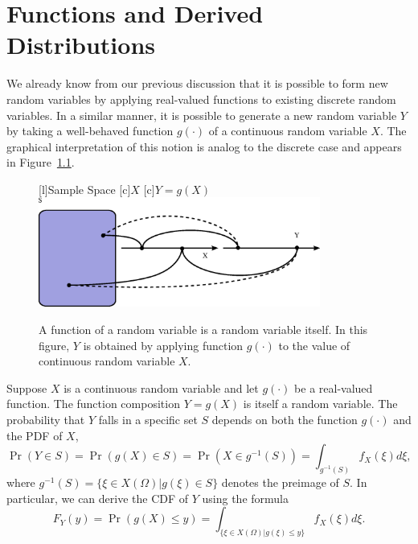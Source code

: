 \chapter{Functions and Derived Distributions}
\label{chapter:DerivedDistributions}

We already know from our previous discussion that it is possible to form new random variables by applying real-valued functions to existing discrete random variables.
In a similar manner, it is possible to generate a new random variable $Y$ by taking a well-behaved function $g(\cdot)$ of a continuous random variable $X$.
The graphical interpretation of this notion is analog to the discrete case and appears in Figure~\ref{figure:FunctionContinuousRV}.

\begin{figure}[ht]
\begin{center}
\begin{psfrags}
[l]{Sample Space}
[c]{$X$}
[c]{$Y = g(X)$}
\includegraphics[width=9.26cm]{Figures/9Chapter/fcn-cnt}
\end{psfrags}
\caption{A function of a random variable is a random variable itself.
In this figure, $Y$ is obtained by applying function $g(\cdot)$ to the value of continuous random variable $X$.}
\label{figure:FunctionContinuousRV}
\end{center}
\end{figure}

Suppose $X$ is a continuous random variable and let $g(\cdot)$ be a real-valued function.
The function composition $Y = g(X)$ is itself a random variable.
The probability that $Y$ falls in a specific set $S$ depends on both the function $g(\cdot)$ and the PDF of $X$,
\begin{equation*}
\Pr (Y \in S) = \Pr (g(X) \in S) 
= \Pr \left( X \in g^{-1}(S) \right)
= \int_{g^{-1} (S)} f_X (\xi) d\xi ,
\end{equation*}
where $g^{-1} (S) = \{ \xi \in X(\Omega) | g(\xi) \in S \}$ denotes the preimage of $S$.
In particular, we can derive the CDF of $Y$ using the formula
\begin{equation} \label{equation:DerivedCDF}
F_Y(y) = \Pr (g(X) \leq y)
= \int_{ \{ \xi \in X(\Omega) | g(\xi) \leq y \} } f_X(\xi) d\xi .
\end{equation}

